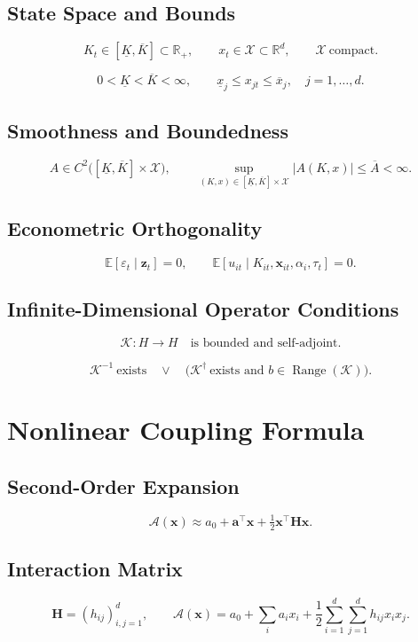 \documentclass[11pt]{article}
\begin{document}
\subsection{State Space and Bounds}

\[
K_t\in[\underline K,\overline K]\subset\mathbb R_+,
\qquad
x_t\in\mathcal X\subset\mathbb R^d,
\qquad
\mathcal X\ \text{compact}.
\]

\[
0<\underline K<\overline K<\infty,
\qquad
\underline x_j\leq x_{jt}\leq \overline x_j,
\quad j=1,\ldots,d.
\]

\subsection{Smoothness and Boundedness}

\[
A\in C^2\big([\underline K,\overline K]\times\mathcal X\big),
\qquad
\sup_{(K,x)\in[\underline K,\overline K]\times\mathcal X}
|A(K,x)|\leq \overline A<\infty.
\]

\subsection{Econometric Orthogonality}
\[
\mathbb{E}[\varepsilon_t\mid \bm{z}_t]=0,
\qquad \mathbb{E}[u_{it}\mid K_{it},\bm{x}_{it},\alpha_i,\tau_t]=0.
\]

\subsection{Infinite-Dimensional Operator Conditions}

\[
\mathcal K:H\to H
\quad
\text{is bounded and self-adjoint}.
\]

\[
\mathcal K^{-1}\ \text{exists}
\quad\vee\quad
\big(\mathcal K^\dagger\ \text{exists and } b\in\operatorname{Range}(\mathcal K)\big).
\]

\section{Nonlinear Coupling Formula}

\subsection{Second-Order Expansion}
\[
\mathcal{A}(\bm{x})\approx a_0+\bm{a}^\top\bm{x}+\tfrac12\bm{x}^\top\bm{H}\bm{x}.
\]

\subsection{Interaction Matrix}
\[
\bm{H}=(h_{ij})_{i,j=1}^d,
\qquad \mathcal{A}(\bm{x})=a_0+\sum_i a_i x_i+\frac12\sum_{i=1}^d\sum_{j=1}^d h_{ij}x_ix_j.
\]
\end{document}
